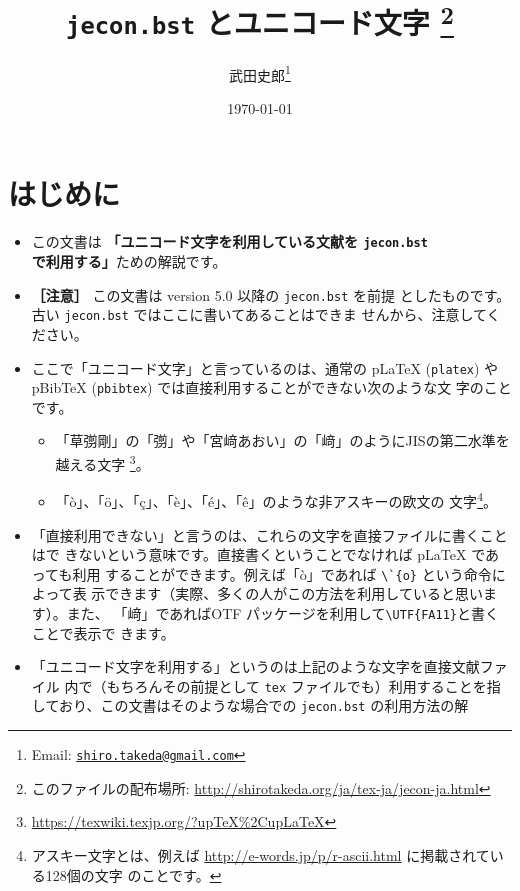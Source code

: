\documentclass[a4paper,10pt]{bxjsarticle}
\title{\textbf{\texttt{jecon.bst} とユニコード文字}
\thanks{このファイルの配布場所: \url{http://shirotakeda.org/ja/tex-ja/jecon-ja.html}}
}
\author{武田史郎\thanks{Email: \texttt{\href{mailto:shiro.takeda@gmail.com}{shiro.takeda@gmail.com}}}}
\date{\today}
\begin{document}
\maketitle

\tableofcontents


\section{はじめに}

\begin{itemize}
 \item この文書は \textbf{「ユニコード文字を利用している文献を
       \texttt{jecon.bst} で利用する」}ための解説です。
 \item \textbf{［注意］} この文書は version 5.0 以降の \texttt{jecon.bst} を前提
       としたものです。古い \texttt{jecon.bst} ではここに書いてあることはできま
       せんから、注意してください。
 \item ここで「ユニコード文字」と言っているのは、通常の pLaTeX (\texttt{platex})
       や pBibTeX (\texttt{pbibtex}) では直接利用することができない次のような文
       字のことです。
       \begin{itemize}
        \item 「草彅剛」の「彅」や「宮﨑あおい」の「﨑」のようにJISの第二水準を
	      越える文字
              \footnote{\url{https://texwiki.texjp.org/?upTeX\%2CupLaTeX}}。
        \item 「ò」、「ö」、「ç」、「è」、「é」、「ê」のような非アスキーの欧文の
	      文字\footnote{アスキー文字とは、例えば
	      \url{http://e-words.jp/p/r-ascii.html} に掲載されている128個の文字
	      のことです。}。
       \end{itemize}
 \item 「直接利用できない」と言うのは、これらの文字を直接ファイルに書くことはで
       きないという意味です。直接書くということでなければ pLaTeX であっても利用
       することができます。例えば「ò」であれば \verb|\`{o}| という命令によって表
       示できます（実際、多くの人がこの方法を利用していると思います）。また、
       「﨑」であればOTF パッケージを利用して\verb|\UTF{FA11}|と書くことで表示で
       きます。
 \item 「ユニコード文字を利用する」というのは上記のような文字を直接文献ファイル
       内で（もちろんその前提として \texttt{tex} ファイルでも）利用することを指
       しており、この文書はそのような場合での \texttt{jecon.bst} の利用方法の解

\end{itemize}
\end{document}
